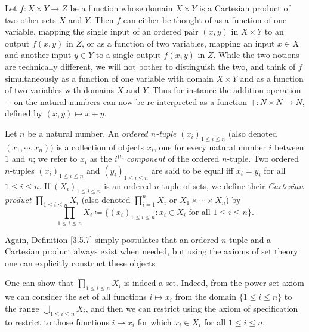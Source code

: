 \begin{note}
Let \(f : X \times Y \to Z\) be a function whose domain \(X \times Y\) is a Cartesian product of two other sets \(X\) and \(Y\).
Then \(f\) can either be thought of as a function of one variable, mapping the single input of an ordered pair \((x, y)\) in \(X \times Y\) to an output \(f(x, y)\) in \(Z\), or as a function of two variables, mapping an input \(x \in X\) and another input \(y \in Y\) to a single output \(f(x, y)\) in \(Z\).
While the two notions are technically different, we will not bother to distinguish the two, and think of \(f\) simultaneously as a function of one variable with domain \(X \times Y\) and as a function of two variables with domains \(X\) and \(Y\).
Thus for instance the addition operation \(+\) on the natural numbers can now be re-interpreted as a function \(+ : N \times N \to N\), defined by \((x, y) \mapsto x + y\).
\end{note}

\setcounter{theorem}{6}
\begin{definition}\label{3.5.7}
Let \(n\) be a natural number.
An \emph{ordered \(n\)-tuple} \((x_i)_{1 \leq i \leq n}\) (also denoted \((x_1, \cdots, x_n)\)) is a collection of objects \(x_i\), one for every natural number \(i\) between \(1\) and \(n\);
we refer to \(x_i\) as the \emph{\(i^{th}\) component} of the ordered \(n\)-tuple.
Two ordered \(n\)-tuples \((x_i)_{1 \leq i \leq n}\) and \((y_i)_{1 \leq i \leq n}\) are said to be equal iff \(x_i = y_i\) for all \(1 \leq i \leq n\).
If \((X_i)_{1 \leq i \leq n}\) is an ordered \(n\)-tuple of sets, we define their \emph{Cartesian product} \(\prod_{1 \leq i \leq n} X_i\) (also denoted \(\prod_{i=1}^n X_i\) or \(X_1 \times \cdots \times X_n\)) by
\[
    \prod_{1 \leq i \leq n} X_i \coloneqq \{(x_i)_{1 \leq i \leq n} : x_i \in X_i \text{ for all } 1 \leq i \leq n\}.
\]
\end{definition}

\begin{note}
Again, Definition \ref{3.5.7} simply postulates that an ordered \(n\)-tuple and a Cartesian product always exist when needed, but using the axioms of set theory one can explicitly construct these objects
\end{note}

\begin{remark}\label{3.5.8}
One can show that \(\prod_{1 \leq i \leq n} X_i\) is indeed a set.
Indeed, from the power set axiom we can consider the set of all functions \(i \mapsto x_i\) from the domain \(\{1 \leq i \leq n\}\) to the range \(\bigcup_{1 \leq i \leq n} X_i\), and then we can restrict using the axiom of specification to restrict to those functions \(i \mapsto x_i\) for which \(x_i \in X_i\) for all \(1 \leq i \leq n\).
\end{remark}

